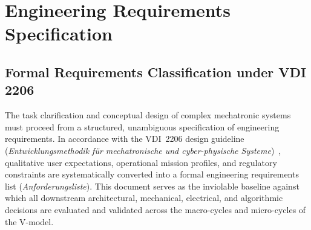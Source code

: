 \section{Engineering Requirements Specification}
\label{sec:requirements}

\subsection{Formal Requirements Classification under VDI 2206}
The task clarification and conceptual design of complex mechatronic systems must proceed from a structured, unambiguous specification of engineering requirements. In accordance with the VDI~2206 design guideline (\emph{Entwicklungsmethodik f{\"u}r mechatronische und cyber-physische Systeme})~\cite{vdi2206}, qualitative user expectations, operational mission profiles, and regulatory constraints are systematically converted into a formal engineering requirements list (\emph{Anforderungsliste}). This document serves as the inviolable baseline against which all downstream architectural, mechanical, electrical, and algorithmic decisions are evaluated and validated across the macro-cycles and micro-cycles of the V-model.

